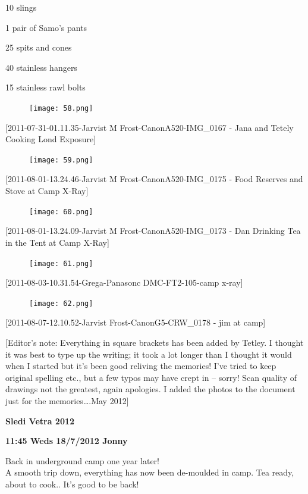 10 slings

1 pair of Samo's pants

25 spits and cones

40 stainless hangers

15 stainless rawl bolts

\begin{figure}[htbp]
\centering
\texttt{[image: 58.png]}
\caption{}
\end{figure}

{[}2011-07-31-01.11.35-Jarvist M Frost-CanonA520-IMG\_0167 - Jana and
Tetely Cooking Lond Exposure{]}

\begin{figure}[htbp]
\centering
\texttt{[image: 59.png]}
\caption{}
\end{figure}

{[}2011-08-01-13.24.46-Jarvist M Frost-CanonA520-IMG\_0175 - Food
Reserves and Stove at Camp X-Ray{]}

\begin{figure}[htbp]
\centering
\texttt{[image: 60.png]}
\caption{}
\end{figure}

{[}2011-08-01-13.24.09-Jarvist M Frost-CanonA520-IMG\_0173 - Dan
Drinking Tea in the Tent at Camp X-Ray{]}

\begin{figure}[htbp]
\centering
\texttt{[image: 61.png]}
\caption{}
\end{figure}

{[}2011-08-03-10.31.54-Grega-Panasonc DMC-FT2-105-camp x-ray{]}

\begin{figure}[htbp]
\centering
\texttt{[image: 62.png]}
\caption{}
\end{figure}

{[}2011-08-07-12.10.52-Jarvist Frost-CanonG5-CRW\_0178 - jim at camp{]}

{[}Editor's note: Everything in square brackets has been added by
Tetley. I thought it was best to type up the writing; it took a lot
longer than I thought it would when I started but it's been good
reliving the memories! I've tried to keep original spelling etc., but a
few typos may have crept in -- sorry! Scan quality of drawings not the
greatest, again apologies. I added the photos to the document just for
the memories\ldots{}.May 2012{]}

\textbf{Sledi Vetra 2012}

\textbf{11:45 Weds 18/7/2012 Jonny}

Back in underground camp one year later!\\
A smooth trip down, everything has now been de-moulded in camp. Tea
ready, about to cook.. It's good to be back!

